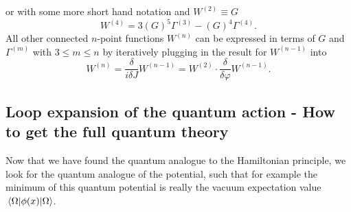 or with some more short hand notation and $W^{(2)} \equiv G$
\begin{equation}
	\label{eq:onePIfourpointfunctionDiagrammatic}
	W^{(4)} = 3 (G)^5 \Gamma^{(3)} - (G)^4 \Gamma^{(4)}.
\end{equation}
All other connected $n$-point functions $W^{(n)}$ can be expressed in terms of $G$ and $\Gamma^{(m)}$ with $3\leq m\leq n$ by iteratively plugging in the result for $W^{(n-1)}$ into 
\begin{equation}
	W^{(n)} = \frac{\delta}{i \delta J} W^{(n-1)} = W^{(2)} \cdot \frac{\delta}{\delta \varphi} W^{(n-1)}.
\end{equation}
 
 

 \subsection{Loop expansion of the quantum action - How to get the full quantum theory}
 Now that we have found the quantum analogue to the Hamiltonian principle, we look for the quantum analogue of the potential, such that for example the minimum of this quantum potential is really the vacuum expectation value $\expval{\phi(x)}{\Omega}$.
